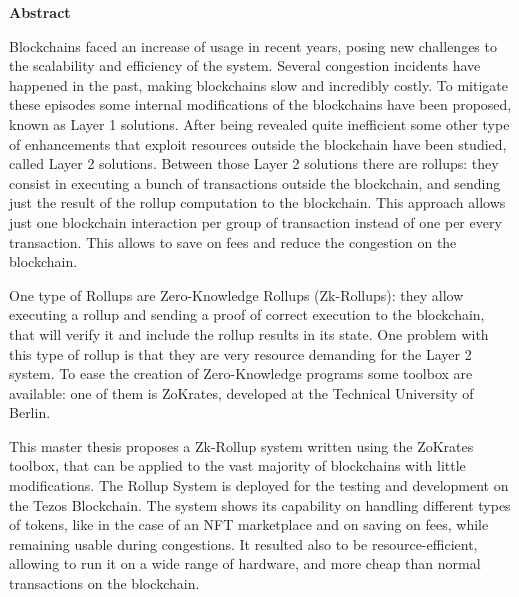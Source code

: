 \thispagestyle{empty}
\vspace*{1.0cm}

\begin{center}
    \textbf{Abstract}
\end{center}

\vspace*{0.5cm}

\noindent
Blockchains faced an increase of usage in recent years, posing new challenges to the scalability and efficiency of the system. Several congestion incidents have happened in the past, making blockchains slow and incredibly costly. To mitigate these episodes some internal modifications of the blockchains have been proposed, known as Layer 1 solutions. After being revealed quite inefficient some other type of enhancements that exploit resources outside the blockchain have been studied, called Layer 2 solutions. Between those Layer 2 solutions there are rollups: they consist in executing a bunch of transactions outside the blockchain, and sending just the result of the rollup computation to the blockchain. This approach allows just one blockchain interaction per group of transaction instead of one per every transaction. This allows to save on fees and reduce the congestion on the blockchain.

One type of Rollups are Zero-Knowledge Rollups (Zk-Rollups): they allow executing a rollup and sending a proof of correct execution to the blockchain, that will verify it and include the rollup results in its state. One problem with this type of rollup is that they are very resource demanding for the Layer 2 system. To ease the creation of Zero-Knowledge programs some toolbox are available: one of them is ZoKrates, developed at the Technical University of Berlin.

This master thesis proposes a Zk-Rollup system written using the ZoKrates toolbox, that can be applied to the vast majority of blockchains with little modifications. The Rollup System is deployed for the testing and development on the Tezos Blockchain. The system shows its capability on handling different types of tokens, like in the case of an NFT marketplace and on saving on fees, while remaining usable during congestions. It resulted also to be resource-efficient, allowing to run it on a wide range of hardware, and more cheap than normal transactions on the blockchain.


